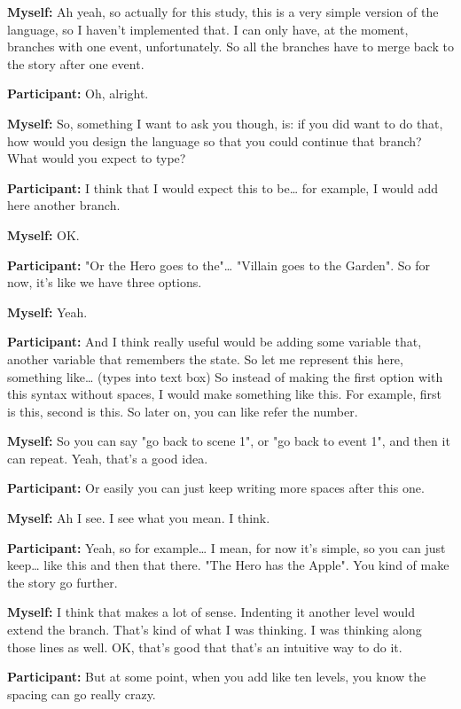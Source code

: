 \documentclass[11pt]{report}
\begin{document}
\begin{linenumbers}
\textbf{Myself:} Ah yeah, so actually for this study, this is a very simple version of the language, so I haven't implemented that. I can only have, at the moment, branches with one event, unfortunately. So all the branches have to merge back to the story after one event.

\textbf{Participant:} Oh, alright.

\textbf{Myself:} So, something I want to ask you though, is: if you did want to do that, how would you design the language so that you could continue that branch? What would you expect to type?

\textbf{Participant:} I think that I would expect this to be\ldots{} for example, I would add here another branch.

\textbf{Myself:} OK.

\textbf{Participant:} "Or the Hero goes to the"\ldots{} "Villain goes to the Garden". So for now, it's like we have three options.

\textbf{Myself:} Yeah.

\textbf{Participant:} And I think really useful would be adding some variable
that, another variable that remembers the state. So let me represent this here,
something like\ldots{} (types into text box) So instead of making the first
option with this syntax without spaces, I would make something like this. For
example, first is this, second is this. So later on, you can like refer the
number.

\textbf{Myself:} So you can say "go back to scene 1", or "go back to event 1", and then it can repeat. Yeah, that's a good idea.

\textbf{Participant:} Or easily you can just keep writing more spaces after this one.

\textbf{Myself:} Ah I see. I see what you mean. I think.

\textbf{Participant:} Yeah, so for example\ldots{} I mean, for now it's simple, so you can just keep\ldots{} like this and then that there. "The Hero has the Apple". You kind of make the story go further.

\textbf{Myself:} I think that makes a lot of sense. Indenting it another level would extend the branch. That's kind of what I was thinking. I was thinking along those lines as well. OK, that's good that that's an intuitive way to do it.

\textbf{Participant:} But at some point, when you add like ten levels, you know the spacing can go really crazy.


\end{linenumbers}
\end{document}
